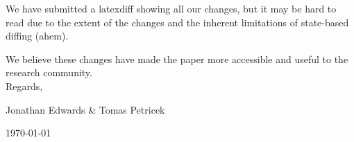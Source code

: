 \documentclass[11pt]{article}
\begin{document}
We have submitted a latexdiff showing all our changes, but it may be hard to read due to the extent of the changes and the inherent limitations of state-based diffing (ahem).

We believe these changes have made the paper more accessible and useful to the research community.
\\

Regards,

Jonathan Edwards \& Tomas Petricek

\today
\end{document}
